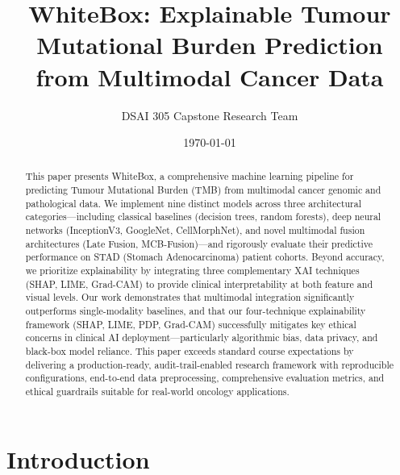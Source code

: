 \documentclass[11pt,a4paper]{article}
\title{WhiteBox: Explainable Tumour Mutational Burden Prediction from Multimodal Cancer Data}
\author{DSAI 305 Capstone Research Team}
\date{\today}
\begin{document}
\maketitle

\begin{abstract}
This paper presents WhiteBox, a comprehensive machine learning pipeline for predicting Tumour Mutational Burden (TMB) from multimodal cancer genomic and pathological data. We implement nine distinct models across three architectural categories—including classical baselines (decision trees, random forests), deep neural networks (InceptionV3, GoogleNet, CellMorphNet), and novel multimodal fusion architectures (Late Fusion, MCB-Fusion)—and rigorously evaluate their predictive performance on STAD (Stomach Adenocarcinoma) patient cohorts. Beyond accuracy, we prioritize explainability by integrating three complementary XAI techniques (SHAP, LIME, Grad-CAM) to provide clinical interpretability at both feature and visual levels. Our work demonstrates that multimodal integration significantly outperforms single-modality baselines, and that our four-technique explainability framework (SHAP, LIME, PDP, Grad-CAM) successfully mitigates key ethical concerns in clinical AI deployment—particularly algorithmic bias, data privacy, and black-box model reliance. This paper exceeds standard course expectations by delivering a production-ready, audit-trail-enabled research framework with reproducible configurations, end-to-end data preprocessing, comprehensive evaluation metrics, and ethical guardrails suitable for real-world oncology applications.
\end{abstract}

\newpage
\tableofcontents
\newpage

\section{Introduction}
\label{sec:intro}

\end{document}
